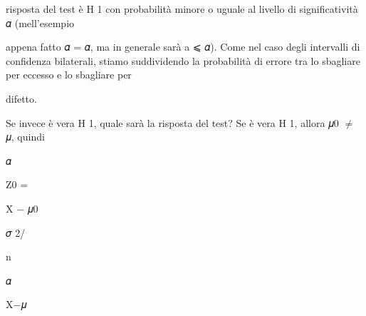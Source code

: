 \documentclass[a4paper,portrait,12pt]{article}
\begin{document}
\begin{flushleft}
risposta del test \`{e} H 1 con probabilit\`{a} minore o uguale al livello di significativit\`{a} 𝛼 (mell'esempio
\end{flushleft}


\begin{flushleft}
appena fatto 𝛼 = 𝛼, ma in generale sar\`{a} a ⩽ 𝛼). Come nel caso degli intervalli di confidenza bilaterali, stiamo suddividendo la probabilit\`{a} di errore tra lo sbagliare per eccesso e lo sbagliare per
\end{flushleft}


\begin{flushleft}
difetto.
\end{flushleft}


\begin{flushleft}
Se invece \`{e} vera H 1, quale sar\`{a} la risposta del test? Se \`{e} vera H 1, allora 𝜇0 $\neq$ 𝜇, quindi
\end{flushleft}


\begin{flushleft}
𝛼
\end{flushleft}





\begin{flushleft}
Z0 =
\end{flushleft}





\begin{flushleft}
X $-$ 𝜇0
\end{flushleft}


\begin{flushleft}
𝜎 2/
\end{flushleft}


\begin{flushleft}
n
\end{flushleft}





\begin{flushleft}
𝛼
\end{flushleft}





\begin{flushleft}
X$-$𝜇
\end{flushleft}
\end{document}
